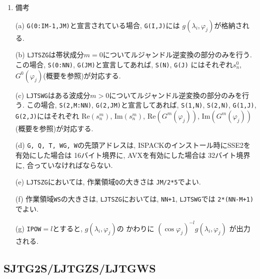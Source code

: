 \documentclass[a4j]{jarticle}
\newcommand{\re}{\mbox{Re}}
\newcommand{\im}{\mbox{Im}}
\begin{document}
\begin{enumerate}
\item 備考

(a) {\tt G(0:IM-1,JM)}と宣言されている場合, {\tt G(I,J)}には
    $g(\lambda_i,\varphi_j)$が格納される.

(b) {\tt LJTSZG}は帯状成分$m=0$についてルジャンドル逆変換の部分のみを行う.
    この場合,
    {\tt S(0:NN)}, {\tt G(JM)}と宣言してあれば, {\tt S(N)}, {\tt G(J)}
    にはそれぞれ$s^0_n$, $G^0(\varphi_j)$(概要を参照)が対応する. 

(c) {\tt LJTSWG}はある波成分$m>0$についてルジャンドル逆変換の部分のみを行う.
    この場合,
    {\tt S(2,M:NN)}, {\tt G(2,JM)}と宣言してあれば, 
    {\tt S(1,N)}, {\tt S(2,N)}, {\tt G(1,J)}, {\tt G(2,J)}にはそれぞれ
    $\re(s^m_n)$, $\im(s^m_n)$, $\re(G^m(\varphi_j))$, $\im(G^m(\varphi_j))$
    (概要を参照)が対応する.
    
(d) {\tt G, Q, T, WG, W}の先頭アドレスは, 
ISPACKのインストール時にSSE2を有効にした場合は
16バイト境界に,
AVXを有効にした場合は
32バイト境界に,
合っていなければならない.

(e) {\tt LJTSZG}においては, 作業領域{\tt Q}の大きさは
    {\tt JM/2*5}でよい.

(f) 作業領域{\tt WS}の大きさは, {\tt LJTSZG}においては, {\tt NN+1},
    {\tt LJTSWG}では {\tt 2*(NN-M+1)}でよい.

(g) {\tt IPOW}$=l$とすると, $g(\lambda_i,\varphi_j)$の
    かわりに $(\cos\varphi_j)^{-l}g(\lambda_i,\varphi_j)$ が出力
    される.

\end{enumerate}


\subsection{SJTG2S/LJTGZS/LJTGWS}
\end{document}
